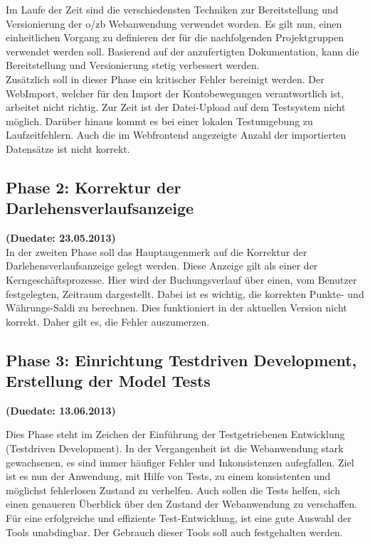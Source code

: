 \documentclass[12pt,             %
               a4paper,          %
               listof=totoc,     %
               index=totoc,      %
               bibliography=totoc,%
               oneside,         %
               BCOR1cm,          %
               english   %
               ]{scrbook}
\begin{document}
Im Laufe der Zeit sind die verschiedensten Techniken zur Bereitstellung und Versionierung der o/zb Webanwendung verwendet worden. Es gilt nun, einen einheitlichen Vorgang zu definieren der für die nachfolgenden Projektgruppen verwendet werden soll. Basierend auf der anzufertigten Dokumentation, kann die Bereitstellung und Versionierung stetig verbessert werden.\\

Zusätzlich soll in dieser Phase ein kritischer Fehler bereinigt werden. Der WebImport, welcher für den Import der Kontobewegungen verantwortlich ist, arbeitet nicht richtig. Zur Zeit ist der Datei-Upload auf dem Testsystem nicht möglich. Darüber hinaus kommt es bei einer lokalen Testumgebung zu Laufzeitfehlern. Auch die im Webfrontend angezeigte Anzahl der importierten Datensätze ist nicht korrekt.

\subsection{Phase 2: Korrektur der Darlehensverlaufsanzeige}
\textbf {(Duedate: 23.05.2013)}\\
In der zweiten Phase soll das Hauptaugenmerk auf die Korrektur der Darlehensverlaufsanzeige gelegt werden. Diese Anzeige gilt als einer der Kerngeschäftsprozesse. Hier wird der Buchungsverlauf über einen, vom Benutzer festgelegten, Zeitraum dargestellt. Dabei ist es wichtig, die korrekten Punkte- und Währungs-Saldi zu berechnen. Dies funktioniert in der aktuellen Version nicht korrekt. Daher gilt es, die Fehler auszumerzen.  


\subsection{Phase 3: Einrichtung Testdriven Development, Erstellung der Model Tests}
\textbf {(Duedate: 13.06.2013)}

Dies Phase steht im Zeichen der Einführung der Testgetriebenen Entwicklung (\glqq Testdriven Development\grqq). In der Vergangenheit ist die Webanwendung stark gewachsenen, es sind immer häufiger Fehler und Inkonsistenzen aufegfallen. Ziel ist es nun der Anwendung, mit Hilfe von Tests, zu einem konsistenten und möglichst fehlerlosen Zustand zu verhelfen. Auch sollen die Tests helfen, sich einen genaueren Überblick über den Zustand der Webanwendung zu verschaffen. Für eine erfolgreiche und effiziente Test-Entwicklung, ist eine gute Auswahl der Tools unabdingbar. Der Gebrauch dieser Tools soll auch festgehalten werden.
\end{document}
